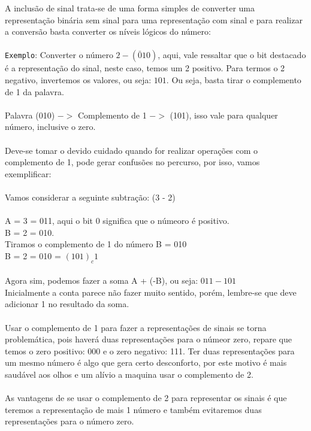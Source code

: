 \documentclass[12pt, onecolumn]{article}
\begin{document}
	A inclusão de sinal trata-se de uma forma simples de converter uma 
	representação binária sem sinal para uma representação com sinal e 
	para realizar a conversão basta converter os níveis lógicos do número:\\
	\\
	\texttt{Exemplo}: Converter o número $2 - (\bar{0}10)$, aqui, vale ressaltar
	que o bit destacado é a representação do sinal, neste caso, temos um 2 
	positivo. Para termos o 2 negativo, invertemos os valores, ou seja: 
	$101$. Ou seja, basta tirar o complemento de 1 da palavra. \\
	\\
	Palavra (010) $->$ Complemento de 1 $->$ (101), isso vale para qualquer número,
	inclusive o zero.\\
	\\
	Deve-se tomar o devido cuidado quando for realizar operações com o 
	complemento de 1, pode gerar confusões no percurso, por isso, vamos
	exemplificar: \\
	\\
	Vamos considerar a seguinte subtração: (3 - 2)\\
	\\
	A = 3 = 011, aqui o bit 0 significa que o númeoro é positivo.\\
	B = 2 = 010.\\
	Tiramos o complemento de 1 do número B = 010\\
	B = 2 = 010 = $(101)_c1$\\
	\\
	Agora sim, podemos fazer a soma A + (-B), ou seja: $011 - 101$\\
	Inicialmente a conta parece não fazer muito sentido, porém, 
	lembre-se que deve adicionar 1 no resultado da soma.\\
	\\	
	Usar o complemento de 1 para fazer a representações de sinais
	se torna problemática, pois haverá duas representações para o
	númeor zero, repare que temos o zero positivo: 000 e o
	zero negativo: 111. Ter duas representações para um mesmo
	número é algo que gera certo desconforto, por este motivo
	é mais saudável aos olhos e um alívio a maquina usar o 
	complemento de 2.\\
	\\
	As vantagens de se usar o complemento de 2 para representar os
	sinais é que teremos a representação de mais 1 número e também
	evitaremos duas representações para o número zero.\\
	\\
\end{document}
